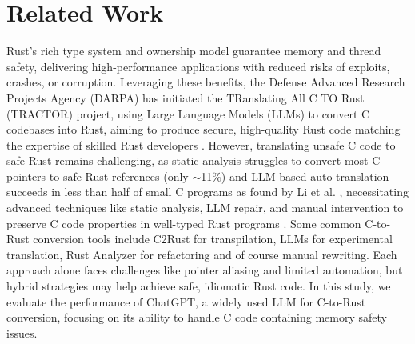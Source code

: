 \documentclass[conference]{IEEEtran}
\begin{document}
\section{Related Work}
Rust's rich type system and ownership model guarantee memory and thread safety, delivering high-performance applications with reduced risks of exploits, crashes, or corruption. Leveraging these benefits, the Defense Advanced Research Projects Agency (DARPA) has initiated the TRanslating All C TO Rust (TRACTOR) project, using Large Language Models (LLMs) to convert C codebases into Rust, aiming to produce secure, high-quality Rust code matching the expertise of skilled Rust developers \cite{darpa_c_to_rust}. However, translating unsafe C code to safe Rust remains challenging, as static analysis struggles to convert most C pointers to safe Rust references (only \(\sim\)11\%) and LLM-based auto-translation succeeds in less than half of small C programs as found by Li et al. \cite{li2024translating}, necessitating advanced techniques like static analysis, LLM repair, and manual intervention to preserve C code properties in well-typed Rust programs \cite{eniser2024towards}. Some common C-to-Rust conversion tools include C2Rust for transpilation, LLMs for experimental translation, Rust Analyzer for refactoring and of course manual rewriting. Each approach alone faces challenges like pointer aliasing and limited automation, but hybrid strategies may help achieve safe, idiomatic Rust code. In this study, we evaluate the performance of ChatGPT, a widely used LLM for C-to-Rust conversion, focusing on its ability to handle C code containing memory safety issues.
\end{document}
